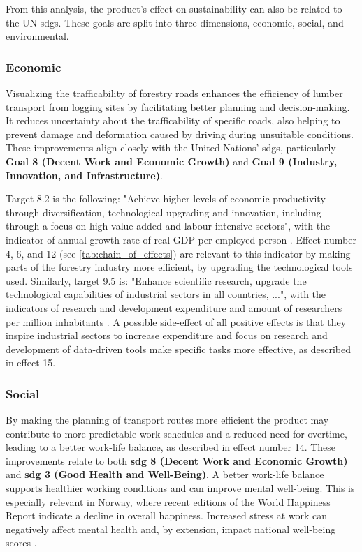 From this analysis, the product's effect on sustainability can also be related to the UN \acrshort{sdg}s. These goals are split into three dimensions, economic, social, and environmental.

\subsubsection{Economic}\label{subsubsec:discussion:product:sustainability:economic}

Visualizing the trafficability of forestry roads enhances the efficiency of lumber transport from logging sites by facilitating better planning and decision-making. It reduces uncertainty about the trafficability of specific roads, also helping to prevent damage and deformation caused by driving during unsuitable conditions. These improvements align closely with the United Nations' \acrshort{sdg}s, particularly \textbf{Goal 8 (Decent Work and Economic Growth)} and \textbf{Goal 9 (Industry, Innovation, and Infrastructure)}. 

Target 8.2 is the following: "Achieve higher levels of economic productivity through diversification, technological upgrading and innovation, including through a focus on high-value added and labour-intensive sectors", with the indicator of annual growth rate of real GDP per employed person \cite{sdgsgoals}. Effect number 4, 6, and 12 (see \autoref{tab:chain_of_effects}) are relevant to this indicator by making parts of the forestry industry more efficient, by upgrading the technological tools used. Similarly, target 9.5 is: "Enhance scientific research, upgrade the technological capabilities of industrial sectors in all countries, ...", with the indicators of research and development expenditure and amount of researchers per million inhabitants \cite{sdgsgoals}. A possible side-effect of all positive effects is that they inspire industrial sectors to increase expenditure and focus on research and development of data-driven tools make specific tasks more effective, as described in effect 15.

\subsubsection{Social}

By making the planning of transport routes more efficient the product may contribute to more predictable work schedules and a reduced need for overtime, leading to a better work-life balance, as described in effect number 14. These improvements relate to both \textbf{\acrshort{sdg} 8 (Decent Work and Economic Growth)} and \textbf{\acrshort{sdg} 3 (Good Health and Well-Being)}. A better work-life balance supports healthier working conditions and can improve mental well-being. This is especially relevant in Norway, where recent editions of the World Happiness Report indicate a decline in overall happiness. Increased stress at work can negatively affect mental health and, by extension, impact national well-being scores \cite{sdg3no}.


